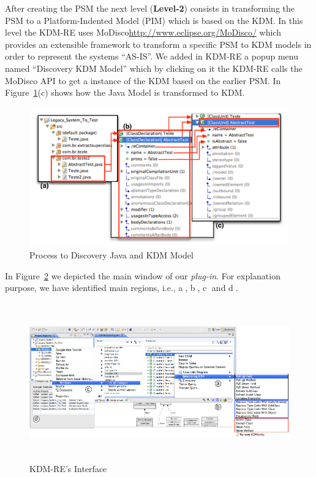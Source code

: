 After creating the PSM the next level (\textbf{Level-2}) consists in transforming the PSM to a Platform-Indented Model (PIM) which is based on the KDM. 
In this level the KDM-RE uses MoDisco\url{http://www.eclipse.org/MoDisco/} which provides an extensible framework to transform a specific PSM to KDM models in order to represent the systems ``AS-IS''. We added in KDM-RE a popup menu named ``Discovery KDM Model'' which by clicking on it the KDM-RE calls the MoDisco API to get a instance of the KDM based on the earlier PSM.
In Figure~\ref{fig:discovery_java_model}(c) shows how the Java Model is transformed to KDM.
%
\begin{figure}[!ht]
\centering
  \includegraphics[width=13cm, height=6cm]{figure/GerandoTODOS}
\caption{Process to Discovery Java and KDM Model}
\label{fig:discovery_java_model}
\end{figure}
%
In Figure~\ref{fig:interface} we depicted the main window of our \textit{plug-in}. 
For explanation purpose, we have identified main regions, i.e., \textcircled{a}, \textcircled{b}, \textcircled{c} and \textcircled{d}.

\begin{figure}[!ht]
\centering
  \includegraphics[width=15cm, height=6.8cm]{figure/ScreenShot_tool}
\caption{KDM-RE's Interface}
\label{fig:interface}
\end{figure}


